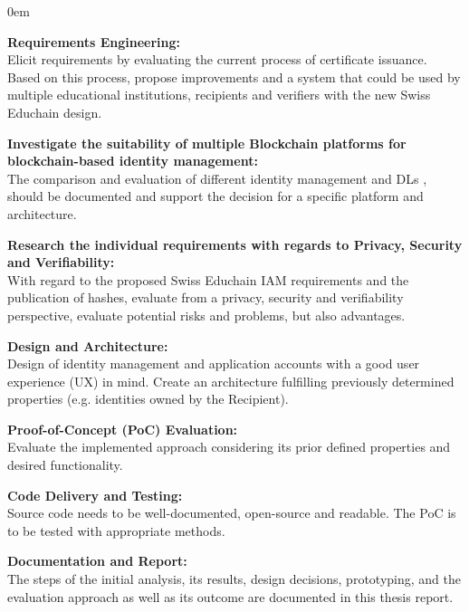 \begin{description}
	\itemsep0em
	\item \textbf{Requirements Engineering:} \\ 
	Elicit requirements by evaluating the current process of certificate issuance. Based on this process, propose improvements and a system that could be used by multiple educational institutions, recipients and verifiers with the new Swiss Educhain design.
	
	\item \textbf{Investigate the suitability of multiple Blockchain platforms for blockchain-based identity management:} \\
	The comparison and evaluation of different identity management and DLs \cite{corda-website}, \cite{hyperledger-wiki} should be documented and support the decision for a specific platform and architecture. 
	
	\item \textbf{Research the individual requirements with regards to Privacy, Security and Verifiability:} \\
	With regard to the proposed Swiss Educhain IAM requirements and the publication of hashes, evaluate from a privacy, security and verifiability perspective, evaluate potential risks and problems, but also advantages. 
	
	\item \textbf{Design and Architecture:} \\
	Design of identity management and application accounts with a good user experience (UX) in mind. Create an architecture fulfilling previously determined properties (e.g. identities owned by the Recipient).
	
	\item \textbf{Proof-of-Concept (PoC) Evaluation:} \\
	Evaluate the implemented approach considering its prior defined properties and desired functionality.
	
	\item \textbf{Code Delivery and Testing:} \\
	Source code needs to be well-documented, open-source and readable. The PoC is to be tested with appropriate methods.
	
	\item \textbf{Documentation and Report:} \\
	The steps of the initial analysis, its results, design decisions, prototyping, and the evaluation approach as well as its outcome are documented in this thesis report.
\end{description}

